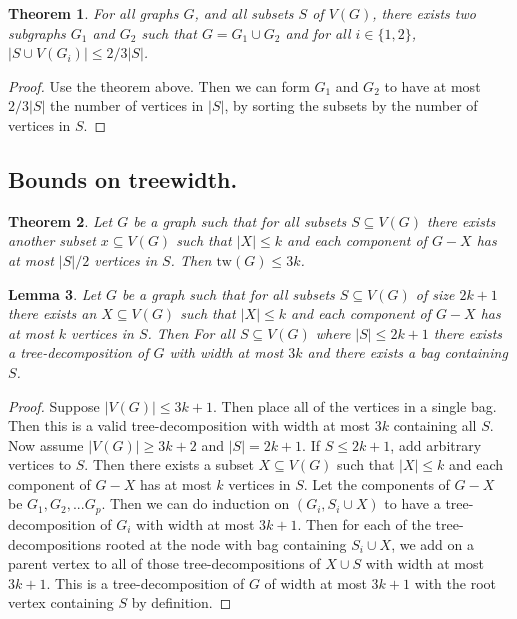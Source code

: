 \documentclass[]{article}
\newcommand{\tw}{\text{tw}}
\newtheorem{theorem}{Theorem}
\newtheorem{lemma}[theorem]{Lemma}
\theoremstyle{definition}
\numberwithin{theorem}{section}
\numberwithin{equation}{section}
\begin{document}
\begin{theorem}
	For all graphs $G$, and all subsets $S$ of $V(G)$, there exists  two subgraphs $G_1$ and $G_2$ such that $G = G_1 \cup G_2$ and for all $i \in \lbrace 1, 2 \rbrace$, $|S \cup V(G_i) | \leq 2/3 |S|$.
\end{theorem}
\begin{proof}
	Use the theorem above. Then we can form $G_1$ and $G_2$ to have at most $2/3 |S|$ the number of vertices in $|S|$, by sorting the subsets by the number of vertices in $S$. 
\end{proof}

\subsection{Bounds on treewidth.}
\begin{theorem}
	Let $G$ be a graph such that for all subsets $S \subseteq V(G)$ there exists another subset $x \subseteq V(G)$ such that $|X| \leq k$ and each component of $G - X$ has at most $|S|/2$ vertices in $S$. Then $\tw(G) \leq 3k$. 
\end{theorem}

\begin{lemma}
	Let $G$ be a graph such that for all subsets $S \subseteq V(G)$ of size $2k + 1$ there exists an $X \subseteq V(G)$ such that $|X| \leq k$ and each component of $G - X$ has at most $k$ vertices in $S$. Then For all $S \subseteq V(G)$ where $|S| \leq 2k+1$ there exists a tree-decomposition of $G$ with width at most $3k$ and there exists a bag containing $S$. 
\end{lemma}
\begin{proof}
	Suppose $|V(G)| \leq 3k + 1$. Then place all of the vertices in a single bag. Then this is a valid tree-decomposition with width at most $3k$ containing all $S$. 
	Now assume $|V(G)| \geq 3k + 2$ and $|S| = 2k + 1$. If $S \leq 2k + 1$, add arbitrary vertices to $S$. Then there exists a subset $X \subseteq V(G)$ such that $|X| \leq k$ and each component of $G - X$ has at most $k$ vertices in $S$. Let the components of $G - X$ be $G_1, G_2, ... G_p$. Then we can do induction on $(G_i, S_i \cup X)$ to have a tree-decomposition of $G_i$ with width at most $3k + 1$. Then for each of the tree-decompositions rooted at the node with bag containing $S_i \cup X$, we add on a parent vertex to all of those tree-decompositions of $X \cup S$ with width at most $3k + 1$.  This is a tree-decomposition of $G$ of width at most $3k + 1$ with the root vertex containing $S$ by definition. 
\end{proof}
\end{document}
